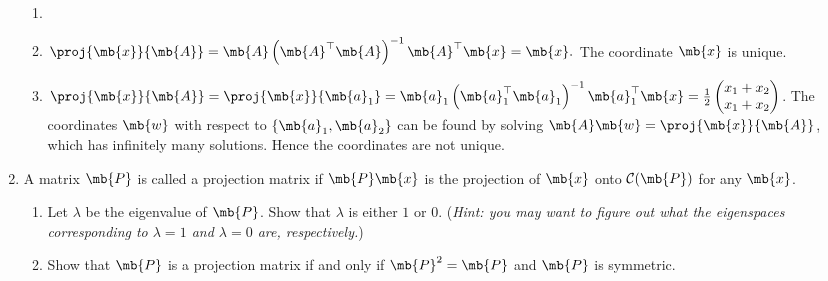 \begin{exercise}[Projection ]
\begin{enumerate}
            
            \begin{solution}
                \begin{enumerate}
                    \item []
                    \item $\proj{\mb{x}}{\mb{A}} = \mb{A}\left(\mb{A}^\top\mb{A}\right)^{-1}\mb{A}^\top\mb{x} = \mb{x}.$ The coordinate $\mb{x}$ is unique.
                    \item $\proj{\mb{x}}{\mb{A}} = \proj{\mb{x}}{\mb{a}_1} = \mb{a}_1\left(\mb{a}_1^\top\mb{a}_1\right)^{-1}\mb{a}_1^\top\mb{x} = \frac{1}{2}\begin{pmatrix}
                                x_1+x_2 \\
                                x_1+x_2
                            \end{pmatrix}$. The coordinates $\mb{w}$ with respect to $\{\mb{a}_1, \mb{a}_2\}$ can be found by solving $\mb{A}\mb{w} = \proj{\mb{x}}{\mb{A}}$, which has infinitely many solutions. Hence the coordinates are not unique.
                        \qedhere
                \end{enumerate}
            \end{solution}
            \pagebreak
        \item A matrix $\mb{P}$ is called a projection matrix if $\mb{P}\mb{x}$ is the projection of $\mb{x}$ onto $\mathcal{C}(\mb{P})$ for any $\mb{x}$.
            \begin{enumerate}
                \item Let $\lambda$ be the eigenvalue of $\mb{P}$. Show that $\lambda$ is either $1$ or $0$. (\emph{Hint: you may want to figure out what the eigenspaces corresponding to $\lambda=1$ and $\lambda=0$ are, respectively.})
                \item Show that $\mb{P}$ is a projection matrix if and only if $\mb{P}^2 = \mb{P}$ and $\mb{P}$ is symmetric.
            \end{enumerate}
            

\end{enumerate}
\end{exercise}
